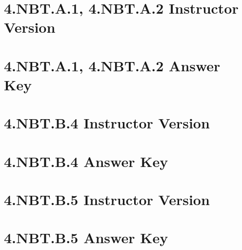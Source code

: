 \documentclass[a4paper,12pt]{article}
\title{}
\date{}
\newcommand{\startPageNumbers}{\setcounter{page}{1}}
\begin{document}


\hypertarget{toc}{}
\tableofcontents
\newpage
\startPageNumbers

\pagestyle{fancy}  %

\newpage
\section{4.NBT.A.1, 4.NBT.A.2 Instructor Version}


\newpage
\section{4.NBT.A.1, 4.NBT.A.2 Answer Key}


\newpage
\section{4.NBT.B.4 Instructor Version}


\newpage
\section{4.NBT.B.4 Answer Key}


\newpage
\section{4.NBT.B.5 Instructor Version}


\newpage
\section{4.NBT.B.5 Answer Key}

\end{document}

